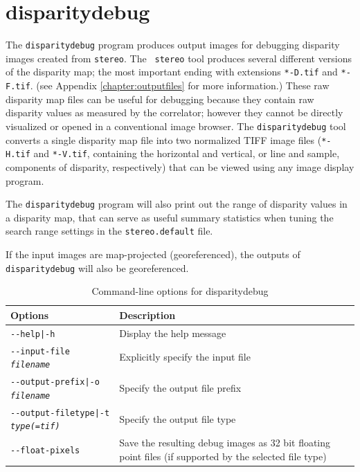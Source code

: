 \clearpage

\section{disparitydebug}
\label{disparitydebug}

The \texttt{disparitydebug} program produces output images for
debugging disparity images created from \verb#stereo#. The {\tt
stereo} tool produces several different versions of the disparity
map; the most important ending with extensions \verb#*-D.tif# and
\verb#*-F.tif#. (see Appendix \ref{chapter:outputfiles} for more
information.)  These raw disparity map files can be useful for
debugging because they contain raw disparity values as measured by
the correlator; however they cannot be directly visualized or opened
in a conventional image browser.  The \verb#disparitydebug# tool
converts a single disparity map file into two normalized TIFF image
files (\verb#*-H.tif# and \verb#*-V.tif#, containing the horizontal
and vertical, or line and sample, components of disparity, respectively)
that can be viewed using any image display program.

The {\tt disparitydebug} program will also print out the range of
disparity values in a disparity map, that can serve as useful summary
statistics when tuning the search range settings in the
{\tt stereo.default} file.

If the input images are map-projected (georeferenced), the outputs
of \texttt{disparitydebug} will also be georeferenced.

\begin{longtable}{|l|p{10cm}|}
\caption{Command-line options for disparitydebug}
\label{tbl:disparitydebug}
\endfirsthead
\endhead
\endfoot
\endlastfoot
\hline
Options & Description \\ \hline \hline
\texttt{-\/-help|-h} & Display the help message\\ \hline
\texttt{-\/-input-file \textit{filename}} & Explicitly specify the input file \\ \hline
\texttt{-\/-output-prefix|-o \textit{filename}} & Specify the output file prefix \\ \hline
\texttt{-\/-output-filetype|-t \textit{type(=tif)}} & Specify the output file type \\ \hline
\texttt{-\/-float-pixels} & Save the resulting debug images as 32 bit floating point files (if supported by the selected file type) \\ \hline
\end{longtable}

